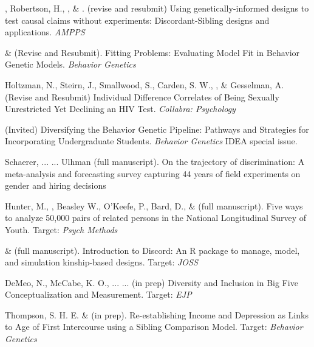 

\item \meb, Robertson, H.\noteA, \jt, \& \joe. (revise and resubmit) Using genetically-informed designs to test causal claims without experiments: Discordant-Sibling designs and applications. \href{https://osf.io/zpdwt/}{\small\color{blue}{osf.io/zpdwt/}} \textit{AMPPS} %

\item \meb \& \joe (Revise and Resubmit). Fitting Problems: Evaluating Model Fit in Behavior Genetic Models. \textit{Behavior Genetics}
\item Holtzman, N., Steirn, J., Smallwood, S., Carden, S. W., \meb, \& Gesselman, A. (Revise and Resubmit) Individual Difference Correlates of Being Sexually Unrestricted Yet Declining an HIV Test. \textit{Collabra: Psychology}%


\item \meb (Invited) Diversifying the Behavior Genetic Pipeline: Pathways and Strategies for Incorporating Undergraduate Students. \textit{Behavior Genetics} IDEA special issue.
\item Schaerer, ... \meb ... Ulhman (full manuscript). On the trajectory of discrimination: A meta-analysis and forecasting survey capturing 44 years of field experiments on gender and hiring decisions

\item Hunter, M., \meb, Beasley W., O'Keefe, P.,  Bard, D., \& \Joe (full manuscript). Five ways to analyze 50,000 pairs of related persons in the National Longitudinal Survey of Youth.  Target: \textit{Psych Methods}

\item \jt \& \meb (full manuscript). Introduction to Discord: An R package to manage, model, and simulation kinship-based designs. Target: \textit{JOSS}
\item DeMeo, N., McCabe, K. O., ... \meb ... (in prep) Diversity and Inclusion in Big Five Conceptualization and Measurement.  Target: \textit{EJP}

\item Thompson, S. H. E. \noteA \& \meb (in prep). Re-establishing Income and Depression as Links to Age of First Intercourse using a Sibling Comparison Model. Target: \textit{Behavior Genetics}

